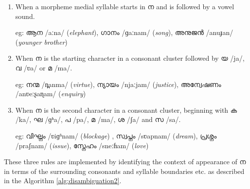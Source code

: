 \begin{enumerate}
	\item When a morpheme medial syllable starts in {\mal ന} and is followed by a vowel
	      sound.

	      eg: {\mal ആന} {\ipa /aːna/} (\textit{elephant}), {\mal ഗാനം} {\ipa /ɡaːnam/}
	      (\textit{song}), {\mal അനുജൻ} {\ipa /anuɟan/} (\textit{younger brother})
	\item When {\mal ന} is the starting character in a consonant cluster followed by
		      {\mal യ} {\ipa /ja/}, {\mal വ} {\ipa /ʋa/} or {\mal മ} {\ipa /ma/}.

	      eg: {\mal നന്മ} {\ipa /n̪anma/} (\textit{virtue}), {\mal ന്യായം} {\ipa /njaːjam/}
	      (\textit{justice}), {\mal അന്വേഷണം} {\ipa /anʋeːʂaɳam/ }(\textit{enquiry})
	\item When {\mal ന} is the second character in a consonant cluster, beginning with
		      {\mal ക} {\ipa /ka/}, {\mal ഘ} {\ipa /ɡʱa/}, {\mal പ} {\ipa /pa/}, {\mal മ}
		      {\ipa /ma/}, {\mal ശ} {\ipa /ʃa/} and {\mal സ} {\ipa /sa/}.

	      eg: {\mal വിഘ്നം} {\ipa /ʋiɡʱnam/} (\textit{blockage}) , {\mal സ്വപ്നം} {\ipa
			      /sʋapnam/} (\textit{dream}), {\mal പ്രശ്നം} {\ipa /praʃnam/} (\textit{issue}),
	      {\mal സ്നേഹം} {\ipa /sneːɦam/} (\textit{love})

\end{enumerate}

These three rules are implemented by identifying the context of appearance of
	{\mal ന} in terms of the surrounding consonants and syllable boundaries etc. as
described in the Algorithm \ref{alg:disambiguation2}.

%


